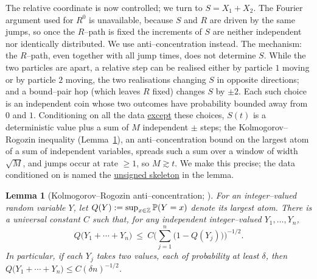 \documentclass[11pt]{article}
\theoremstyle{plain}
\newtheorem{lemma}[theorem]{Lemma}
\theoremstyle{definition}
\theoremstyle{remark}
\newcommand{\Z}{\mathbb{Z}}\newcommand{\R}{\mathbb{R}}\newcommand{\N}{\mathbb{N}}
\begin{document}
The relative coordinate is now controlled; we turn to $S=X_1+X_2$. The Fourier argument
used for $R^0$ is unavailable, because $S$ and $R$ are driven by the same jumps, so once
the $R$--path is fixed the increments of $S$ are neither independent nor identically
distributed. We use anti--concentration instead. The mechanism: the $R$--path, even
together with all jump times, does not determine $S$. While the two particles are apart,
a relative step can be realised either by particle $1$ moving or by particle $2$ moving,
the two realisations changing $S$ in opposite directions; and a bound--pair hop (which
leaves $R$ fixed) changes $S$ by $\pm2$. Each such choice is an independent coin whose
two outcomes have probability bounded away from $0$ and $1$. Conditioning on all the data
\underline{except} these choices, $S(t)$ is a deterministic value plus a sum of $M$
independent $\pm$ steps; the Kolmogorov--Rogozin inequality (Lemma~\ref{lem:KR}), an
anti--concentration bound on the largest atom of a sum of independent variables, spreads
such a sum over a window of width $\sqrt M$, and jumps occur at rate $\ge1$, so
$M\gtrsim t$. We make this precise; the data conditioned on is named the \underline{unsigned
skeleton} in the lemma.

\begin{lemma}[Kolmogorov--Rogozin anti--concentration; {\cite[Ch.~III]{Petrov}}]
\label{lem:KR}
For an integer--valued random variable $Y$, let $Q(Y):=\sup_{x\in\Z}\PP(Y=x)$ denote
its largest atom. There is a universal constant $C$ such that, for any independent
integer--valued $Y_1,\dots,Y_n$,
\[
  Q\big(Y_1+\cdots+Y_n\big)\ \le\
  C\Big(\textstyle\sum_{j=1}^n\big(1-Q(Y_j)\big)\Big)^{-1/2}.
\]
In particular, if each $Y_j$ takes two values, each of probability at least $\delta$,
then $Q\big(Y_1+\cdots+Y_n\big)\le C(\delta n)^{-1/2}$.
\end{lemma}
\end{document}
